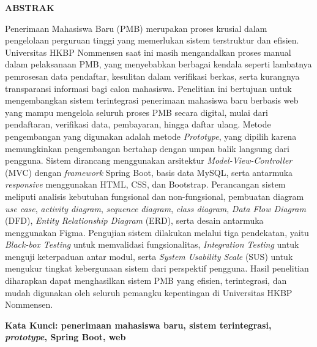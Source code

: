 \clearpage
{}%
\thispagestyle{fancy}

\begin{center}
	\large \bfseries \MakeUppercase{Abstrak}\\
	\bigskip
	
	\normalsize \normalfont \justifying \singlespacing
	Penerimaan Mahasiswa Baru (PMB) merupakan proses krusial dalam pengelolaan perguruan tinggi yang memerlukan sistem terstruktur dan efisien. Universitas HKBP Nommensen saat ini masih mengandalkan proses manual dalam pelaksanaan PMB, yang menyebabkan berbagai kendala seperti lambatnya pemrosesan data pendaftar, kesulitan dalam verifikasi berkas, serta kurangnya transparansi informasi bagi calon mahasiswa. Penelitian ini bertujuan untuk mengembangkan sistem terintegrasi penerimaan mahasiswa baru berbasis web yang mampu mengelola seluruh proses PMB secara digital, mulai dari pendaftaran, verifikasi data, pembayaran, hingga daftar ulang. Metode pengembangan yang digunakan adalah metode \textit{Prototype}, yang dipilih karena memungkinkan pengembangan bertahap dengan umpan balik langsung dari pengguna. Sistem dirancang menggunakan arsitektur \textit{Model-View-Controller} (MVC) dengan \textit{framework} Spring Boot, basis data MySQL, serta antarmuka \textit{responsive} menggunakan HTML, CSS, dan Bootstrap. Perancangan sistem meliputi analisis kebutuhan fungsional dan non-fungsional, pembuatan diagram \textit{use case}, \textit{activity diagram}, \textit{sequence diagram}, \textit{class diagram}, \textit{Data Flow Diagram} (DFD), \textit{Entity Relationship Diagram} (ERD), serta desain antarmuka menggunakan Figma. Pengujian sistem dilakukan melalui tiga pendekatan, yaitu \textit{Black-box Testing} untuk memvalidasi fungsionalitas, \textit{Integration Testing} untuk menguji keterpaduan antar modul, serta \textit{System Usability Scale} (SUS) untuk mengukur tingkat kebergunaan sistem dari perspektif pengguna. Hasil penelitian diharapkan dapat menghasilkan sistem PMB yang efisien, terintegrasi, dan mudah digunakan oleh seluruh pemangku kepentingan di Universitas HKBP Nommensen.\par

    \vspace{20pt}
	\raggedright \textbf{Kata Kunci: penerimaan mahasiswa baru, sistem terintegrasi, \textit{prototype}, Spring Boot, web}
	
	\vfill
	
\end{center}
\clearpage
